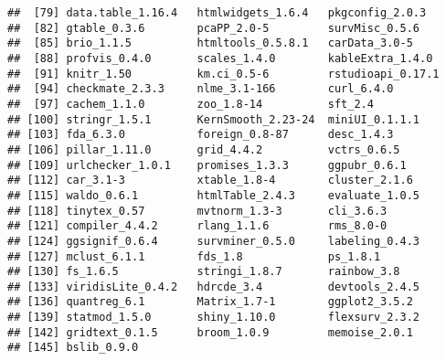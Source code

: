 \documentclass[
]{article}
\begin{document}
\begin{verbatim}
##  [79] data.table_1.16.4   htmlwidgets_1.6.4   pkgconfig_2.0.3    
##  [82] gtable_0.3.6        pcaPP_2.0-5         survMisc_0.5.6     
##  [85] brio_1.1.5          htmltools_0.5.8.1   carData_3.0-5      
##  [88] profvis_0.4.0       scales_1.4.0        kableExtra_1.4.0   
##  [91] knitr_1.50          km.ci_0.5-6         rstudioapi_0.17.1  
##  [94] checkmate_2.3.3     nlme_3.1-166        curl_6.4.0         
##  [97] cachem_1.1.0        zoo_1.8-14          sft_2.4            
## [100] stringr_1.5.1       KernSmooth_2.23-24  miniUI_0.1.1.1     
## [103] fda_6.3.0           foreign_0.8-87      desc_1.4.3         
## [106] pillar_1.11.0       grid_4.4.2          vctrs_0.6.5        
## [109] urlchecker_1.0.1    promises_1.3.3      ggpubr_0.6.1       
## [112] car_3.1-3           xtable_1.8-4        cluster_2.1.6      
## [115] waldo_0.6.1         htmlTable_2.4.3     evaluate_1.0.5     
## [118] tinytex_0.57        mvtnorm_1.3-3       cli_3.6.3          
## [121] compiler_4.4.2      rlang_1.1.6         rms_8.0-0          
## [124] ggsignif_0.6.4      survminer_0.5.0     labeling_0.4.3     
## [127] mclust_6.1.1        fds_1.8             ps_1.8.1           
## [130] fs_1.6.5            stringi_1.8.7       rainbow_3.8        
## [133] viridisLite_0.4.2   hdrcde_3.4          devtools_2.4.5     
## [136] quantreg_6.1        Matrix_1.7-1        ggplot2_3.5.2      
## [139] statmod_1.5.0       shiny_1.10.0        flexsurv_2.3.2     
## [142] gridtext_0.1.5      broom_1.0.9         memoise_2.0.1      
## [145] bslib_0.9.0
\end{verbatim}
\end{document}

